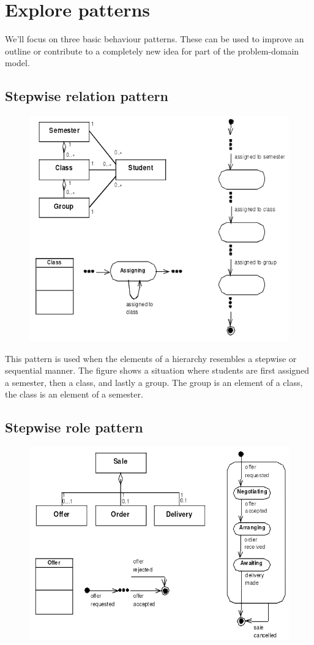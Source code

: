 \section{Explore patterns}
We'll focus on three basic behaviour patterns. These can be used to improve an outline or contribute to a completely new idea for part of the problem-domain model.

\subsection{Stepwise relation pattern}
\begin{figure}[H]
    \centering
    \includegraphics[width=.6\textwidth]{figures/stepwiserelation.png}
\end{figure}

This pattern is used when the elements of a hierarchy  resembles a stepwise or sequential manner. The figure shows a situation where students are first assigned a semester, then a class, and lastly a group. The group is an element of a class, the class is an element of a semester.

\subsection{Stepwise role pattern}
\begin{figure}[H]
    \centering
    \includegraphics[width=.6\textwidth]{figures/stepwiserole.png}
\end{figure}

